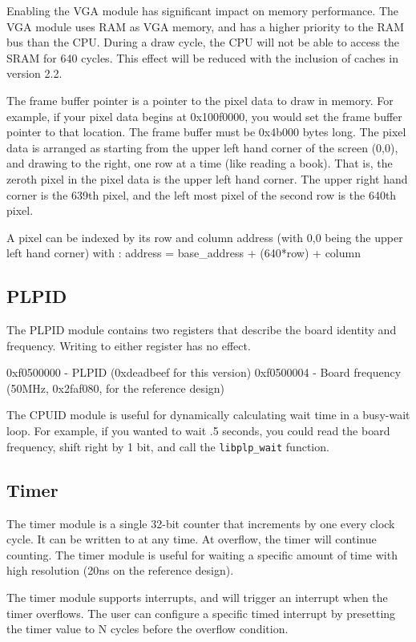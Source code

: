 \documentclass{article}
\begin{document}
Enabling the VGA module has significant impact on memory performance. The VGA module uses RAM as VGA memory, and has a higher priority to the RAM bus than the CPU. During a draw cycle, the CPU will not be able to access the SRAM for 640 cycles. This effect will be reduced with the inclusion of caches in version 2.2.

The frame buffer pointer is a pointer to the pixel data to draw in memory. For example, if your pixel data begins at 0x100f0000, you would set the frame buffer pointer to that location. The frame buffer must be 0x4b000 bytes long. The pixel data is arranged as starting from the upper left hand corner of the screen (0,0), and drawing to the right, one row at a time (like reading a book). That is, the zeroth pixel in the pixel data is the upper left hand corner. The upper right hand corner is the 639th pixel, and the left most pixel of the second row is the 640th pixel.

A pixel can be indexed by its row and column address (with 0,0 being the upper left hand corner) with : address = base\_address + (640*row) + column 

\subsection{PLPID}
The PLPID module contains two registers that describe the board identity and frequency. Writing to either register has no effect.

0xf0500000 - PLPID (0xdeadbeef for this version) 0xf0500004 - Board frequency (50MHz, 0x2faf080, for the reference design)

The CPUID module is useful for dynamically calculating wait time in a busy-wait loop. For example, if you wanted to wait .5 seconds, you could read the board frequency, shift right by 1 bit, and call the \verb+libplp_wait+ function. 

\subsection{Timer}
The timer module is a single 32-bit counter that increments by one every clock cycle. It can be written to at any time. At overflow, the timer will continue counting. The timer module is useful for waiting a specific amount of time with high resolution (20ns on the reference design).

The timer module supports interrupts, and will trigger an interrupt when the timer overflows. The user can configure a specific timed interrupt by presetting the timer value to N cycles before the overflow condition. 
\end{document}
